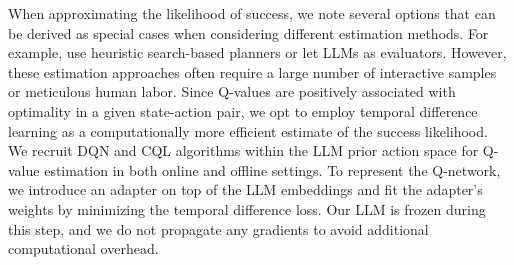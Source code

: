 \documentclass{article} %
\theoremstyle{plain}
\theoremstyle{definition}
\theoremstyle{remark}
\begin{document}
When approximating the likelihood of success, we note several options that can be derived as special cases when considering different estimation methods. For example, \citep{feng2023alphazero,hao2023reasoning} use heuristic search-based planners or  \citep{yao2024tree, zhang2024can} let LLMs as evaluators. However, these estimation approaches often require a large number of interactive samples or meticulous human labor.
Since Q-values are positively associated with optimality in a given state-action pair, 
we opt to employ temporal difference learning \citep{tesauro1995temporal} as a computationally more efficient estimate of the success likelihood. We recruit DQN and CQL algorithms within the LLM prior action space for Q-value estimation in both online and offline settings. To represent the Q-network, we introduce an adapter on top of the LLM embeddings and fit the adapter's weights by minimizing the temporal difference loss. Our LLM is frozen during this step, and we do not propagate any gradients to avoid additional computational overhead. 
\fi

 
\end{document}
